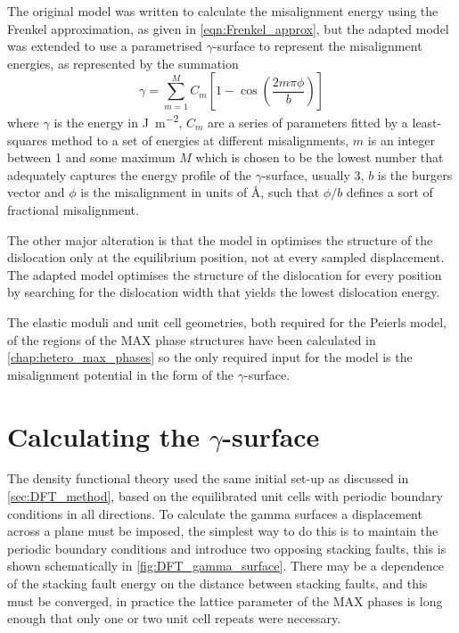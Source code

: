 The original model was written to calculate the misalignment energy using the Frenkel approximation, as given in \autoref{eqn:Frenkel_approx}, but the adapted model was extended to use a parametrised $\gamma$-surface to represent the misalignment energies, as represented by the summation
\begin{equation}
\gamma = \sum_{m=1}^{M} C_m \left[ 1 - \cos \left( \frac{2m\pi \phi}{b} \right) \right]\label{eqn:gamma_surface}
\end{equation}
where $\gamma$ is the energy in \si{\joule\per\meter\squared}, $C_m$ are a series of parameters fitted by a least-squares method to a set of energies at different misalignments, $m$ is an integer between 1 and some maximum $M$ which is chosen to be the lowest number that adequately captures the energy profile of the $\gamma$-surface, usually 3, $b$ is the burgers vector and $\phi$ is the misalignment in units of \si{\angstrom}, such that $\phi/b$ defines a sort of fractional misalignment.

The other major alteration is that the model in \cite{Clegg2006} optimises the structure of the dislocation only at the equilibrium position, not at every sampled displacement. The adapted model optimises the structure of the dislocation for every position by searching for the dislocation width that yields the lowest dislocation energy.


The elastic moduli and unit cell geometries, both required for the Peierls model, of the regions of the MAX phase structures have been calculated in \autoref{chap:hetero_max_phases} so the only required input for the model is the misalignment potential in the form of the $\gamma$-surface.

\section{Calculating the \texorpdfstring{$\gamma$}{gamma}-surface}


The density functional theory used the same initial set-up as discussed in \autoref{sec:DFT_method}, based on the equilibrated unit cells with periodic boundary conditions in all directions. To calculate the gamma surfaces a displacement across a plane must be imposed, the simplest way to do this is to maintain the periodic boundary conditions and introduce two opposing stacking faults, this is shown schematically in \autoref{fig:DFT_gamma_surface}. There may be a dependence of the stacking fault energy on the distance between stacking faults, and this must be converged, in practice the lattice parameter of the MAX phases is long enough that only one or two unit cell repeats were necessary.

